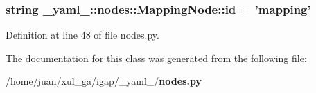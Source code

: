 \subsubsection{\setlength{\rightskip}{0pt plus 5cm}string {\bf \_\-yaml\_\-::nodes::MappingNode::id} = 'mapping'\hspace{0.3cm}{\tt  [static]}}\label{class__yaml___1_1nodes_1_1MappingNode_6c4367580d6ebb52fd6608337aaed4df}




Definition at line 48 of file nodes.py.

The documentation for this class was generated from the following file:\begin{CompactItemize}
\item 
/home/juan/xul\_\-ga/igap/\_\-yaml\_\-/{\bf nodes.py}\end{CompactItemize}
